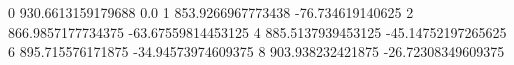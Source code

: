 0 930.6613159179688 0.0
1 853.9266967773438 -76.734619140625
2 866.9857177734375 -63.67559814453125
4 885.5137939453125 -45.14752197265625
6 895.715576171875 -34.94573974609375
8 903.938232421875 -26.72308349609375

